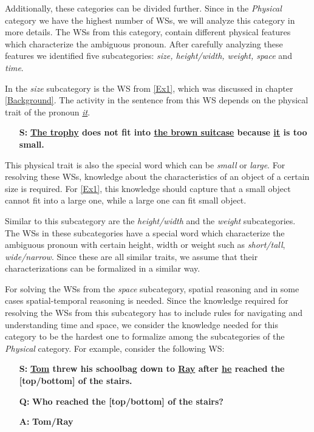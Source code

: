 Additionally, these categories can be divided further.
Since in the \textit{Physical} category we have the highest number of WSs, we will analyze this category in more details. The WSs from this category, contain different physical features which characterize the ambiguous pronoun. After carefully analyzing these features we identified five subcategories: \textit{size, height/width, weight, space} and \textit{time}. 

In the \textit{size} subcategory is the WS from \ref{Ex1}, which was discussed in chapter \ref{Background}.
The activity in the sentence from this WS depends on the physical trait of the pronoun \textit{\underline{it}}.
\begin{itemize}
	\item[\textbf{S:}] \textbf{\underline{The trophy} does not fit into \underline{the brown suitcase} because \underline{it} is too small.}
\end{itemize}
This physical trait is also the special word which can be \textit{small} or \textit{large}. For resolving these WSs, knowledge about the characteristics of an object of a certain size is required. For \ref{Ex1}, this knowledge should capture that a small object cannot fit into a large one, while a large one can fit small object.

Similar to this subcategory are the \textit{height/width} and the \textit{weight} subcategories. The WSs in these subcategories have a special word which characterize the ambiguous pronoun with certain height, width or weight such as \textit{short/tall}, \textit{wide/narrow}. Since these are all similar traits, we assume that their characterizations can be formalized in a similar way.


For solving the WSs from the \textit{space} subcategory, spatial reasoning and in some cases spatial-temporal reasoning is needed. Since the knowledge required for resolving the WSs from this subcategory has to include rules for navigating and understanding time and space, we consider the knowledge needed for this category to be the hardest one to formalize among the subcategories of the \textit{Physical} category.
For example, consider the following WS:\\
\begin{itemize} 
	\item[\textbf{S:}] \textbf{\underline{Tom} threw his schoolbag down to \underline{Ray} after \underline{he} reached the [top/bottom] of the stairs.}
	\item[\textbf{Q:}] \textbf{Who reached the [top/bottom] of the stairs?}
	\item[\textbf{A:}] \textbf{Tom/Ray}
\end{itemize}

